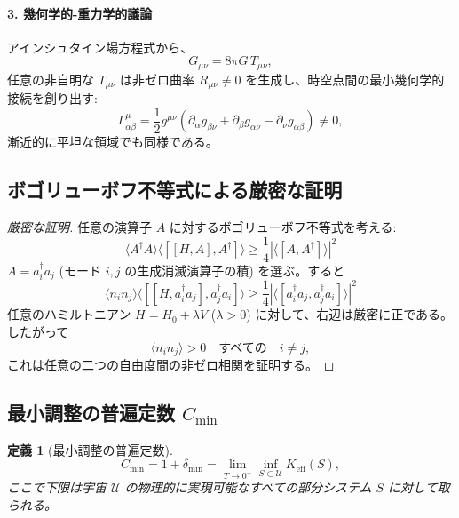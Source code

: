\documentclass[11pt,a4paper]{article}
\newtheorem{definition}{定義}
\begin{document}
	\paragraph*{3. 幾何学的-重力学的議論}
	アインシュタイン場方程式から、
	\[
	G_{\mu\nu} = 8\pi G \, T_{\mu\nu},
	\]
	任意の非自明な $T_{\mu\nu}$ は非ゼロ曲率 $R_{\mu\nu} \neq 0$ を生成し、時空点間の最小幾何学的接続を創り出す:
	\[
	\Gamma^{\mu}_{\alpha\beta} = \frac{1}{2} g^{\mu\nu}(\partial_\alpha g_{\beta\nu} + \partial_\beta g_{\alpha\nu} - \partial_\nu g_{\alpha\beta}) \neq 0,
	\]
	漸近的に平坦な領域でも同様である。
	
	\subsection{ボゴリューボフ不等式による厳密な証明}
	
	\begin{proof}[厳密な証明]
		任意の演算子 $A$ に対するボゴリューボフ不等式を考える:
		\begin{equation}
			\langle A^\dagger A \rangle \langle [[H, A], A^\dagger] \rangle \geq \frac{1}{4} |\langle [A, A^\dagger] \rangle|^2
		\end{equation}
		$A = a_i^\dagger a_j$ (モード $i,j$ の生成消滅演算子の積) を選ぶ。すると
		\begin{equation}
			\langle n_i n_j \rangle \langle [[H, a_i^\dagger a_j], a_j^\dagger a_i] \rangle \geq \frac{1}{4} |\langle [a_i^\dagger a_j, a_j^\dagger a_i] \rangle|^2
		\end{equation}
		任意のハミルトニアン $H = H_0 + \lambda V$ ($\lambda > 0$) に対して、右辺は厳密に正である。したがって
		\begin{equation}
			\langle n_i n_j \rangle > 0 \quad \text{すべての} \quad i \neq j,
		\end{equation}
		これは任意の二つの自由度間の非ゼロ相関を証明する。
	\end{proof}
	
	\subsection{最小調整の普遍定数 $C_{\min}$}
	
	\begin{definition}[最小調整の普遍定数]
		\[
		C_{\min} = 1 + \delta_{\min} = \lim_{T \to 0^+} \inf_{S \subset \mathcal{U}} K_{\mathrm{eff}}(S),
		\]
		ここで下限は宇宙 $\mathcal{U}$ の物理的に実現可能なすべての部分システム $S$ に対して取られる。
	\end{definition}
	
\end{document}
